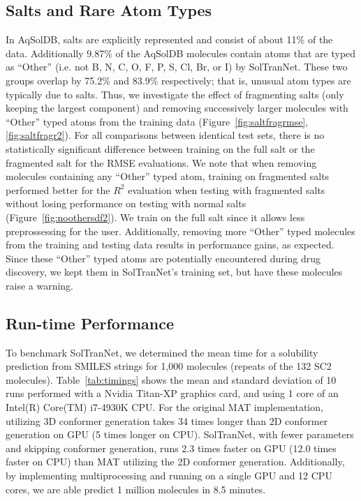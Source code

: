 \documentclass[journal=jcim,manuscript=applicationnotes]{achemso}
\begin{document}
\subsection{Salts and Rare Atom Types}
In AqSolDB, salts are explicitly represented and consist of about 11\% of the data.
Additionally 9.87\% of the AqSolDB molecules contain atoms that are typed as ``Other'' (i.e. not B, N, C, O, F, P, S, Cl, Br, or I) by SolTranNet.
These two groups overlap by 75.2\% and 83.9\% respectively; that is, unusual atom types are typically due to salts.
Thus, we investigate the effect of fragmenting salts (only keeping the largest component) and removing successively larger molecules with ``Other'' typed atoms from the training data (Figure~\ref{fig:saltfragrmse},\ref{fig:saltfragr2}).
For all comparisons between identical test sets, there is no statistically significant difference between training on the full salt or the fragmented salt for the RMSE evaluations.
We note that when removing molecules containing any ``Other'' typed atom, training on fragmented salts performed better for the $R^2$ evaluation when testing with fragmented salts without losing performance on testing with normal salts (Figure~\ref{fig:noothersdf2}).
We train on the full salt since it allows less preprossessing for the user.
Additionally, removing more ``Other'' typed molecules from the training and testing data results in performance gains, as expected.
Since these ``Other'' typed atoms are potentially encountered during drug discovery, we kept them in SolTranNet's training set, but have these molecules raise a warning.

\subsection{Run-time Performance}

To benchmark SolTranNet, we determined the mean time for a solubility prediction from SMILES strings for 1,000 molecules (repeats of the 132 SC2 molecules).
Table~\ref{tab:timings} shows the mean and standard deviation of 10 runs performed with a Nvidia Titan-XP graphics card, and using 1 core of an Intel(R) Core(TM) i7-4930K CPU.
For the original MAT implementation, utilizing 3D conformer generation takes 34 times longer than 2D conformer generation on GPU (5 times longer on CPU).
SolTranNet, with fewer parameters and skipping conformer generation, runs 2.3 times faster on GPU (12.0 times faster on CPU) than MAT utilizing the 2D conformer generation.
Additionally, by implementing multiprocessing and running on a single GPU and 12 CPU cores, we are able predict 1 million molecules in 8.5 minutes.
\end{document}
